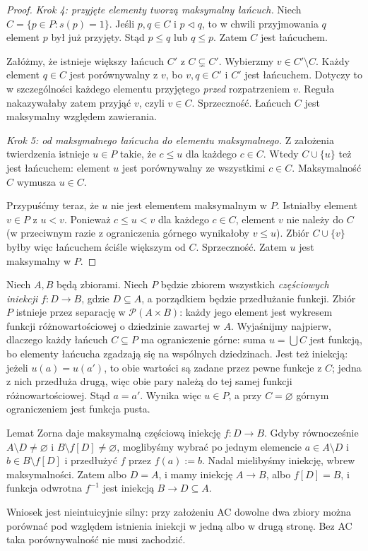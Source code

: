 \begin{proof}
\emph{Krok 4: przyjęte elementy tworzą maksymalny łańcuch.}
Niech $C=\{p\in P:s(p)=1\}$.
Jeśli $p,q\in C$ i $p\triangleleft q$, to w chwili
przyjmowania $q$ element $p$ był już przyjęty.
Stąd $p\le q$ lub $q\le p$. Zatem $C$ jest łańcuchem.

Załóżmy, że istnieje większy łańcuch $C'$ z
$C\subsetneq C'$. Wybierzmy $v\in C'\setminus C$.
Każdy element $q\in C$ jest porównywalny z $v$,
bo $v,q\in C'$ i $C'$ jest łańcuchem.
Dotyczy to w szczególności każdego elementu
przyjętego \emph{przed} rozpatrzeniem $v$.
Reguła nakazywałaby zatem przyjąć $v$,
czyli $v\in C$. Sprzeczność. Łańcuch $C$
jest maksymalny względem zawierania.

\emph{Krok 5: od maksymalnego łańcucha do elementu maksymalnego.}
Z założenia twierdzenia istnieje $u\in P$ takie, że
$c\le u$ dla każdego $c\in C$.
Wtedy $C\cup\{u\}$ też jest łańcuchem:
element $u$ jest porównywalny ze wszystkimi $c\in C$.
Maksymalność $C$ wymusza $u\in C$.

Przypuśćmy teraz, że $u$ nie jest elementem maksymalnym
w $P$. Istniałby element $v\in P$ z $u<v$.
Ponieważ $c\le u<v$ dla każdego $c\in C$,
element $v$ nie należy do $C$ (w przeciwnym razie
z ograniczenia górnego wynikałoby $v\le u$).
Zbiór $C\cup\{v\}$ byłby więc łańcuchem ściśle
większym od $C$. Sprzeczność.
Zatem $u$ jest maksymalny w $P$.
\end{proof}

\begin{przyklad}
Niech $A,B$ będą zbiorami. Niech $P$ będzie zbiorem
wszystkich \emph{częściowych iniekcji} $f:D\to B$, gdzie
$D\subseteq A$, a porządkiem będzie przedłużanie funkcji.
Zbiór $P$ istnieje przez separację w $\mathcal P(A\times B)$:
każdy jego element jest wykresem funkcji różnowartościowej
o dziedzinie zawartej w $A$.
Wyjaśnijmy najpierw, dlaczego każdy łańcuch $C\subseteq P$
ma ograniczenie górne: suma $u=\bigcup C$ jest funkcją,
bo elementy łańcucha zgadzają się na wspólnych dziedzinach.
Jest też iniekcją: jeżeli $u(a)=u(a')$, to obie wartości
są zadane przez pewne funkcje z $C$; jedna z nich
przedłuża drugą, więc obie pary należą do tej samej
funkcji różnowartościowej. Stąd $a=a'$.
Wynika więc $u\in P$, a przy $C=\varnothing$ górnym
ograniczeniem jest funkcja pusta.

Lemat Zorna daje maksymalną częściową iniekcję
$f:D\to B$. Gdyby równocześnie $A\setminus D\ne\varnothing$
i $B\setminus f[D]\ne\varnothing$, moglibyśmy wybrać
po jednym elemencie $a\in A\setminus D$ i
$b\in B\setminus f[D]$ i przedłużyć $f$ przez
$f(a):=b$. Nadal mielibyśmy iniekcję, wbrew
maksymalności. Zatem albo $D=A$, i mamy iniekcję
$A\to B$, albo $f[D]=B$, i funkcja odwrotna $f^{-1}$
jest iniekcją $B\to D\subseteq A$.

Wniosek jest nieintuicyjnie silny: przy założeniu AC
dowolne dwa zbiory można porównać pod względem
istnienia iniekcji w jedną albo w drugą stronę.
Bez AC taka porównywalność nie musi zachodzić.
\end{przyklad}



